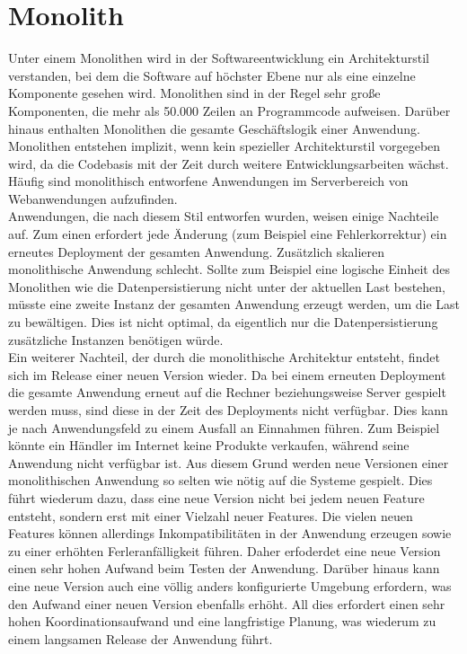 \section{Monolith}
Unter einem Monolithen wird in der Softwareentwicklung ein Architekturstil verstanden, bei dem die Software auf höchster Ebene nur als eine einzelne Komponente gesehen wird. Monolithen sind in der Regel sehr große Komponenten, die mehr als 50.000 Zeilen an Programmcode aufweisen. Darüber hinaus enthalten Monolithen die gesamte Geschäftslogik einer Anwendung. Monolithen entstehen implizit, wenn kein spezieller Architekturstil vorgegeben wird, da die Codebasis mit der Zeit durch weitere Entwicklungsarbeiten wächst. Häufig sind monolithisch entworfene Anwendungen im Serverbereich von Webanwendungen aufzufinden. \\
Anwendungen, die nach diesem Stil entworfen wurden, weisen einige Nachteile auf. Zum einen erfordert jede Änderung (zum Beispiel eine Fehlerkorrektur) ein erneutes Deployment der gesamten Anwendung. Zusätzlich skalieren monolithische Anwendung schlecht. Sollte zum Beispiel eine logische Einheit des Monolithen wie die Datenpersistierung nicht unter der aktuellen Last bestehen, müsste eine zweite Instanz der gesamten Anwendung erzeugt werden, um die Last zu bewältigen. Dies ist nicht optimal, da eigentlich nur die Datenpersistierung zusätzliche Instanzen benötigen würde. \\
Ein weiterer Nachteil, der durch die monolithische Architektur entsteht, findet sich im Release einer neuen Version wieder. Da bei einem erneuten Deployment die gesamte Anwendung erneut auf die Rechner beziehungsweise Server gespielt werden muss, sind diese in der Zeit des Deployments nicht verfügbar. Dies kann je nach Anwendungsfeld zu einem Ausfall an Einnahmen führen. Zum Beispiel könnte ein Händler im Internet keine Produkte verkaufen, während seine Anwendung nicht verfügbar ist. Aus diesem Grund werden neue Versionen einer monolithischen Anwendung so selten wie nötig auf die Systeme gespielt. Dies führt wiederum dazu, dass eine neue Version nicht bei jedem neuen Feature entsteht, sondern erst mit einer Vielzahl neuer Features. Die vielen neuen Features können allerdings Inkompatibilitäten in der Anwendung erzeugen sowie zu einer erhöhten Ferleranfälligkeit führen. Daher erfoderdet eine neue Version einen sehr hohen Aufwand beim Testen der Anwendung. Darüber hinaus kann eine neue Version auch eine völlig anders konfigurierte Umgebung erfordern, was den Aufwand einer neuen Version ebenfalls erhöht. All dies erfordert einen sehr hohen Koordinationsaufwand und eine langfristige Planung, was wiederum zu einem langsamen Release der Anwendung führt.